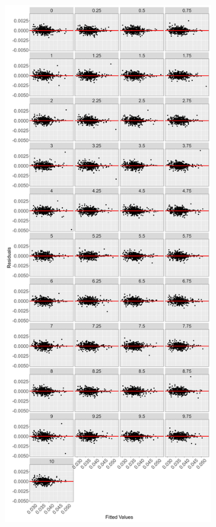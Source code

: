 \begin{figure}[!htbp]
\begin{subfigure}{0.49\textwidth}
        \label{fig:resid vs fit poly model p 2}
    \end{subfigure}
    \hfill
    \begin{subfigure}{0.49\textwidth}
        \centering
        \captionsetup{justification=centering}
        \includegraphics[width=\textwidth]{Figures/Model Checking/zero_coupon_yields_phase_3_HJM_2F_procedure_2_spline_model_fitted_vs_residual_plot.png}

\end{subfigure}
\end{figure}
